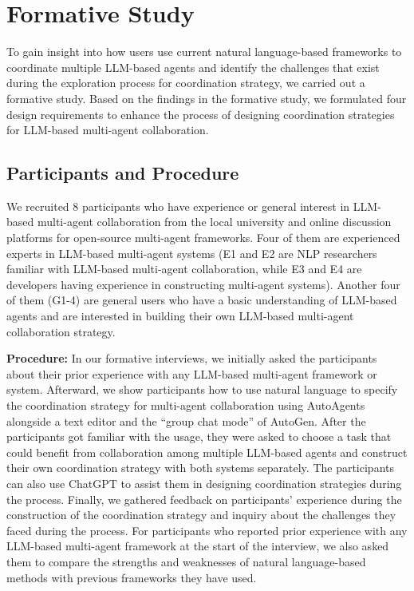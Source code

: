 \section{Formative Study}
To gain insight into how users use current natural language-based frameworks to coordinate multiple LLM-based agents and identify the challenges that exist during the exploration process for coordination strategy, we carried out a formative study. Based on the findings in the formative study, we formulated four design requirements to enhance the process of designing coordination strategies for LLM-based multi-agent collaboration.
\subsection{Participants and Procedure}

We recruited 8 participants who have experience or general interest in LLM-based multi-agent collaboration from the local university and online discussion platforms for open-source multi-agent frameworks. Four of them are experienced experts in LLM-based multi-agent systems (E1 and E2 are NLP researchers familiar with LLM-based multi-agent collaboration, while E3 and E4 are developers having experience in constructing multi-agent systems). Another four of them (G1-4) are general users who have a basic understanding of LLM-based agents and are interested in building their own LLM-based multi-agent collaboration strategy. 

\textbf{Procedure:} In our formative interviews,
we initially asked the participants about their prior experience with any LLM-based multi-agent framework or system. Afterward, we show participants how to use natural language to specify the coordination strategy for multi-agent collaboration using AutoAgents \cite{AutoAgents} alongside a text editor and the ``group chat mode'' of AutoGen\cite{wu2023autogen}. After the participants got familiar with the usage, they were asked to choose a task that could benefit from collaboration among multiple LLM-based agents and construct their own coordination strategy with both systems separately. The participants can also use ChatGPT to assist them in designing coordination strategies during the process. Finally, we gathered feedback on participants' experience during the construction of the coordination strategy and inquiry about the challenges they faced during the process. For participants who reported prior experience with any LLM-based multi-agent framework at the start of the interview, we also asked them to compare the strengths and weaknesses of natural language-based methods with previous frameworks they have used.

